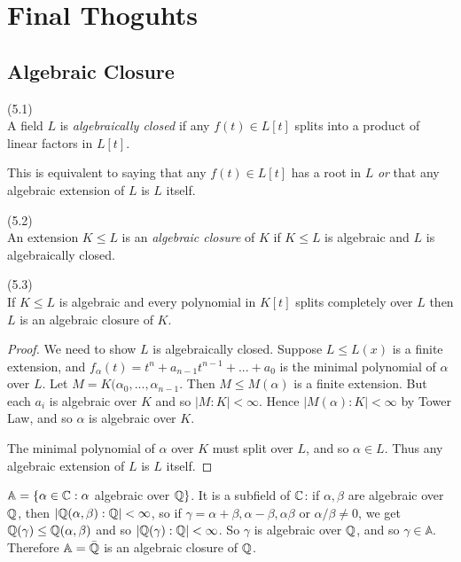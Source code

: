 \documentclass[a4paper]{article}
\begin{document}
\newpage

\section{Final Thoguhts}
\subsection{Algebraic Closure}
\begin{defi}(5.1)\\
A field $L$ is \emph{algebraically closed} if any $f(t) \in L[t]$ splits into a product of linear factors in $L[t]$.
\end{defi}

\begin{rem}
This is equivalent to saying that any $f(t) \in L[t]$ has a root in $L$ \emph{or} that any algebraic extension of $L$ is $L$ itself.
\end{rem}

\begin{defi}(5.2)\\
An extension $K \leq L$ is an \emph{algebraic closure} of $K$ if $K \leq L$ is algebraic and $L$ is algebraically closed.
\end{defi}

\begin{lemma}(5.3)\\
If $K \leq L$ is algebraic and every polynomial in $K[t]$ splits completely over $L$ then $L$ is an algebraic closure of $K$.
\begin{proof}
We need to show $L$ is algebraically closed. Suppose $L \leq L(x)$ is a finite extension, and $f_\alpha(t) = t^n+a_{n-1}t^{n-1}+...+a_0$ is the minimal polynomial of $\alpha$ over $L$. Let $M = K(\alpha_0,...,\alpha_{n-1}$. Then $M \leq M(\alpha)$ is a finite extension. But each $a_i$ is algebraic over $K$ and so $|M:K|<\infty$. Hence $|M(\alpha):K|<\infty$ by Tower Law, and so $\alpha$ is algebraic over $K$.

The minimal polynomial of $\alpha$ over $K$ must split over $L$, and so $\alpha \in L$. Thus any algebraic extension of $L$ is $L$ itself.
\end{proof}

\begin{eg}
$\mathbb{A} = \{\alpha \in \mathbb{C}:\alpha$ algebraic over $\mathbb{Q}\}$. It is a subfield of $\mathbb{C}$: if $\alpha,\beta$ are algebraic over $\mathbb{Q}$, then $|\mathbb{Q}(\alpha,\beta):\mathbb{Q}|<\infty$, so if $\gamma = \alpha+\beta,\alpha-\beta,\alpha\beta$ or $\alpha/\beta \neq 0$, we get $\mathbb{Q}(\gamma) \leq \mathbb{Q}(\alpha,\beta)$ and so $|\mathbb{Q}(\gamma):\mathbb{Q}| < \infty$. So $\gamma$ is algebraic over $\mathbb{Q}$, and so $\gamma \in \mathbb{A}$. Therefore $\mathbb{A} = \bar{\mathbb{Q}}$ is an algebraic closure of $\mathbb{Q}$.
\end{eg}
\end{lemma}
\end{document}
